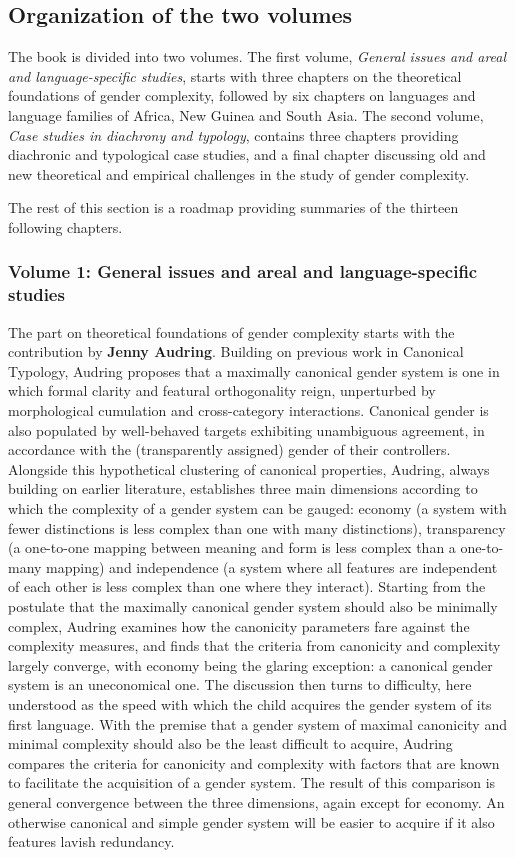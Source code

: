 \documentclass[output=collectionpaper]{langsci/langscibook}
\begin{document}
\subsection*{Organization of the two volumes}
The book is divided into two volumes. The first volume, \textit{General issues and areal and language-specific studies}, starts with three chapters on the theoretical foundations of gender complexity, followed by six chapters on languages and language families of Africa, New Guinea and South Asia. The second volume, \textit{Case studies in diachrony and typology}, contains three chapters providing diachronic and typological case studies, and a final chapter discussing old and new theoretical and empirical challenges in the study of gender complexity.

The rest of this section is a roadmap providing summaries of the thirteen following chapters.

\subsubsection*{Volume 1: General issues and areal and language-specific studies}
The part on theoretical foundations of gender complexity starts with the contribution by \textbf{Jenny Audring}. Building on previous work in Canonical Typology, Audring proposes that a maximally canonical gender system is one in which formal clarity and featural orthogonality reign, unperturbed by morphological cumulation and cross-category interactions. Canonical gender is also populated by well-behaved targets exhibiting unambiguous agreement, in accordance with the (transparently assigned) gender of their controllers. Alongside this hypothetical clustering of canonical properties, Audring, always building on earlier literature, establishes three main dimensions according to which the complexity of a gender system can be gauged: economy (a system with fewer distinctions is less complex than one with many distinctions), transparency (a one-to-one mapping between meaning and form is less complex than a one-to-many mapping) and independence (a system where all features are independent of each other is less complex than one where they interact). Starting from the postulate that the maximally canonical gender system should also be minimally complex, Audring examines how the canonicity parameters fare against the complexity measures, and finds that the criteria from canonicity and complexity largely converge, with economy being the glaring exception: a canonical gender system is an uneconomical one. The discussion then turns to difficulty, here understood as the speed with which the child acquires the gender system of its first language. With the premise that a gender system of maximal canonicity and minimal complexity should also be the least difficult to acquire, Audring compares the criteria for canonicity and complexity with factors that are known to facilitate the acquisition of a gender system. The result of this comparison is general convergence between the three dimensions, again except for economy. An otherwise canonical and simple gender system will be easier to acquire if it also features lavish redundancy.
\end{document}
